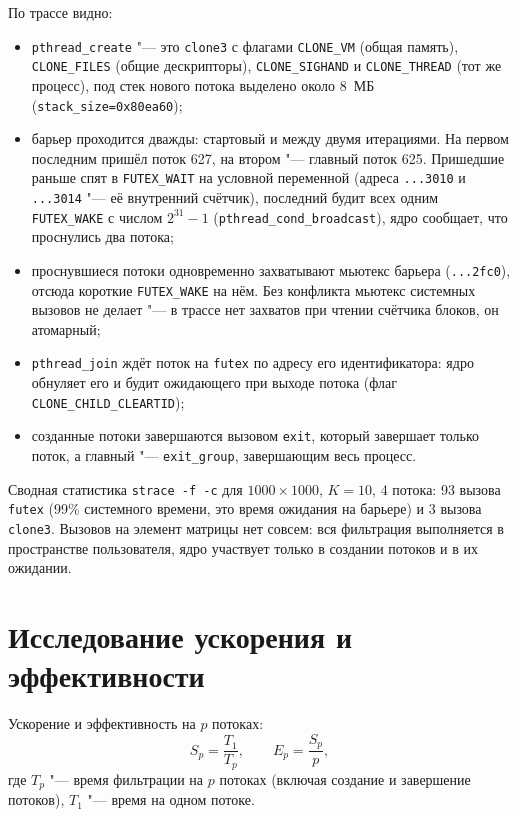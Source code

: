 \documentclass[12pt,a4paper]{article}
\begin{document}
По трассе видно:
\begin{itemize}
    \item \texttt{pthread\_create} "--- это \texttt{clone3} с флагами
          \texttt{CLONE\_VM} (общая память), \texttt{CLONE\_FILES} (общие
          дескрипторы), \texttt{CLONE\_SIGHAND} и \texttt{CLONE\_THREAD} (тот же
          процесс), под стек нового потока выделено около 8~МБ
          (\texttt{stack\_size=0x80ea60});
    \item барьер проходится дважды: стартовый и между двумя итерациями. На
          первом последним пришёл поток 627, на втором "--- главный поток 625.
          Пришедшие раньше спят в \texttt{FUTEX\_WAIT} на условной переменной
          (адреса \texttt{...3010} и \texttt{...3014} "--- её внутренний счётчик),
          последний будит всех одним \texttt{FUTEX\_WAKE} с числом
          $2^{31}-1$ (\texttt{pthread\_cond\_broadcast}), ядро сообщает, что
          проснулись два потока;
    \item проснувшиеся потоки одновременно захватывают мьютекс барьера
          (\texttt{...2fc0}), отсюда короткие \texttt{FUTEX\_WAKE} на нём.
          Без конфликта мьютекс системных вызовов не делает "--- в трассе нет
          захватов при чтении счётчика блоков, он атомарный;
    \item \texttt{pthread\_join} ждёт поток на \texttt{futex} по адресу его
          идентификатора: ядро обнуляет его и будит ожидающего при выходе потока
          (флаг \texttt{CLONE\_CHILD\_CLEARTID});
    \item созданные потоки завершаются вызовом \texttt{exit}, который
          завершает только поток, а главный "--- \texttt{exit\_group}, завершающим
          весь процесс.
\end{itemize}

Сводная статистика \texttt{strace -f -c} для $1000 \times 1000$, $K = 10$, 4
потока: 93 вызова \texttt{futex} (99\% системного времени, это время ожидания
на барьере) и 3 вызова \texttt{clone3}. Вызовов на элемент матрицы нет совсем:
вся фильтрация выполняется в пространстве пользователя, ядро участвует только в
создании потоков и в их ожидании.


\section{Исследование ускорения и эффективности}
\setcounter{table}{0}
Ускорение и эффективность на $p$ потоках:
\[
    S_p = \frac{T_1}{T_p}, \qquad E_p = \frac{S_p}{p},
\]
где $T_p$ "--- время фильтрации на $p$ потоках (включая создание и завершение
потоков), $T_1$ "--- время на одном потоке.
\end{document}
